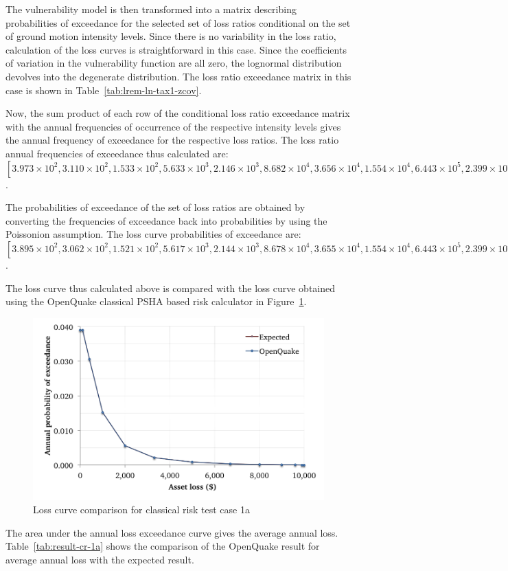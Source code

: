 The vulnerability model is then transformed into a matrix describing probabilities of exceedance for the selected set of loss ratios conditional on the set of ground motion intensity levels. Since there is no variability in the loss ratio, calculation of the loss curves is straightforward in this case. Since the coefficients of variation in the vulnerability function are all zero, the lognormal distribution devolves into the degenerate distribution. The loss ratio exceedance matrix in this case is shown in Table~\ref{tab:lrem-ln-tax1-zcov}.



Now, the sum product of each row of the conditional loss ratio exceedance matrix with the annual frequencies of occurrence of the respective intensity levels gives the annual frequency of exceedance for the respective loss ratios. The loss ratio annual frequencies of exceedance thus calculated are: $[3.973\times10^{2}, 3.110\times10^{2}, 1.533\times10^{2}, 5.633\times10^{3}, 2.146\times10^{3}, 8.682\times10^{4}, 3.656\times10^{4}, 1.554\times10^{4}, 6.443\times10^{5}, 2.399\times10^{5}]$.

The probabilities of exceedance of the set of loss ratios are obtained by converting the frequencies of exceedance back into probabilities by using the Poissonion assumption. The loss curve probabilities of exceedance are: $[3.895\times10^{2}, 3.062\times10^{2}, 1.521\times10^{2}, 5.617\times10^{3}, 2.144\times10^{3}, 8.678\times10^{4}, 3.655\times10^{4}, 1.554\times10^{4}, 6.443\times10^{5}, 2.399\times10^{5}, 5.683\times10^{6}]$.

The loss curve thus calculated above is compared with the loss curve obtained using the OpenQuake classical PSHA based risk calculator in Figure~\ref{fig:lc-cr-1a}.

\begin{figure}[htbp]
\centering
\includegraphics[width=12cm]{qareport/figures/fig-lc-cr-1a}
\caption{Loss curve comparison for classical risk test case 1a}
\label{fig:lc-cr-1a}
\end{figure}

The area under the annual loss exceedance curve gives the average annual loss. Table~\ref{tab:result-cr-1a} shows the comparison of the OpenQuake result for average annual loss with the expected result.
